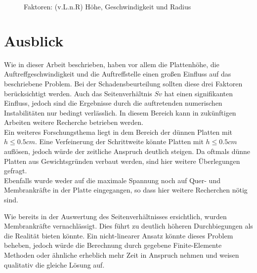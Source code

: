 \begin{figure}[H]%
	\centering
	\qquad
	\caption{Faktoren: (v.L.n.R) Höhe, Geschwindigkeit und Radius}%
	\label{fig:Faktoren}%
\end{figure}



\section*{Ausblick}
\label{sec:Ausblick}

Wie in dieser Arbeit beschrieben, haben vor allem die Plattenhöhe, die Auftreffgeschwindigkeit und die Auftreffstelle einen großen Einfluss auf das beschriebene Problem. Bei der Schadensbeurteilung sollten diese drei Faktoren berücksichtigt werden. Auch das Seitenverhältnis $Sv$ hat einen signifikanten Einfluss, jedoch sind die Ergebnisse durch die auftretenden numerischen Instabilitäten nur bedingt verlässlich. In diesem Bereich kann in zukünftigen Arbeiten weitere Recherche betrieben werden. \\
Ein weiteres Forschungsthema liegt in dem Bereich der dünnen Platten mit $h \leq 0.5 cm$. Eine Verfeinerung der Schrittweite könnte Platten mit $h \leq 0.5 cm$ auflösen, jedoch würde der zeitliche Anspruch deutlich steigen. Da oftmals dünne Platten aus Gewichtsgründen verbaut werden, sind hier weitere Überlegungen gefragt. \\
Ebenfalls wurde weder auf die maximale Spannung noch auf Quer- und Membrankräfte in der Platte eingegangen, so dass hier weitere Recherchen nötig sind.

Wie bereits in der Auswertung des Seitenverhältnisses ersichtlich, wurden Membrankräfte vernachlässigt. Dies führt zu deutlich höheren Durchbiegungen als die Realität bieten könnte.
Ein nicht-linearer Ansatz könnte dieses Problem beheben, jedoch würde die Berechnung durch gegebene Finite-Elemente Methoden oder ähnliche erheblich mehr Zeit in Anspruch nehmen und weisen qualitativ die gleiche Lösung auf.

